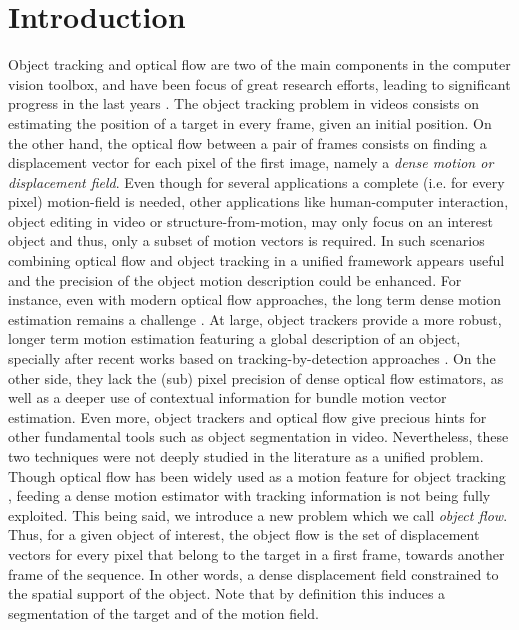 
\chapter{Introduction} \label{chap:intro}

Object tracking and optical flow are two of the main components in the
computer vision toolbox, and have been focus of great research efforts, 
leading to significant progress in the last years \cite{c16}\cite{c17}. 
The object tracking problem in videos consists on estimating the 
position of a target in every frame, given an initial position. On the
other hand, the optical flow between a pair of frames consists on finding a displacement vector 
for each pixel of the first image, namely a {\it dense motion  or displacement field}. Even though for several
applications a complete (i.e. for every pixel) motion-field is needed, other applications like
human-computer interaction, object editing in video or structure-from-motion,
may only focus on an interest object and thus, only a subset of motion vectors is required. 
In such scenarios combining optical flow and object tracking in a unified 
framework appears useful and the precision of the object motion description 
could be enhanced. For instance, even with modern optical flow approaches, 
the long term dense motion estimation remains a challenge \cite{c20}\cite{c22}.  At large, object trackers provide a more robust, 
longer term motion estimation featuring a global description of an object, specially after recent works based on tracking-by-detection approaches \cite{c16}\cite{c23}\cite{c24}. 
On the other side, they lack the (sub) pixel precision of dense optical flow estimators, as well as a deeper use of contextual information for bundle motion 
vector estimation. 
Even more,  object trackers and optical flow give precious hints for other fundamental tools such as 
object segmentation in video. Nevertheless,
these two techniques were not deeply studied in the literature as a unified problem. Though optical flow has been widely used as a motion 
feature for object tracking \cite{c25}, feeding a dense motion estimator with tracking information is not being fully exploited.
This being said, we introduce  a new problem which we call {\it object flow}. Thus, for a given object of interest, 
the object flow is the set of displacement vectors for every pixel that belong to the target in a first frame, 
towards another frame of the sequence. In other words, a dense displacement  field constrained to the spatial support of the object. 
Note that by definition this induces a segmentation of the target and of the motion field.


